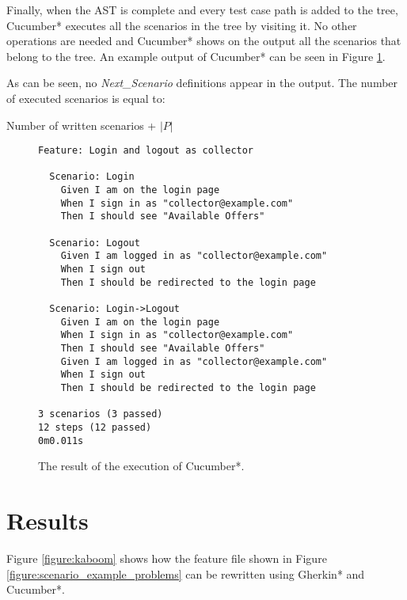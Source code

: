Finally, when the AST is complete and every test case path is added to the tree, Cucumber* executes all the scenarios in the tree by visiting it. No other operations are needed and Cucumber* shows on the output all the scenarios that belong to the tree. An example output of Cucumber* can be seen in Figure \ref{figure:scenario_example_next_scenario_executed}.

As can be seen, no \textit{Next\_Scenario} definitions appear in the output. The number of executed scenarios is equal to:
\begin{center}
Number of written scenarios + $|P|$
\end{center}

\newpage
\begin{figure}[H]
\begin{verbatim}
Feature: Login and logout as collector

  Scenario: Login
    Given I am on the login page
    When I sign in as "collector@example.com"
    Then I should see "Available Offers"

  Scenario: Logout
    Given I am logged in as "collector@example.com"
    When I sign out
    Then I should be redirected to the login page

  Scenario: Login->Logout
    Given I am on the login page
    When I sign in as "collector@example.com"
    Then I should see "Available Offers"
    Given I am logged in as "collector@example.com"
    When I sign out
    Then I should be redirected to the login page

3 scenarios (3 passed)
12 steps (12 passed)
0m0.011s
\end{verbatim}
\vspace{-1em}
\caption{The result of the execution of Cucumber*.}
\label{figure:scenario_example_next_scenario_executed}
\end{figure}

\newpage
\section{Results}

Figure \ref{figure:kaboom} shows how the feature file shown in Figure \ref{figure:scenario_example_problems} can be rewritten using Gherkin* and Cucumber*.

